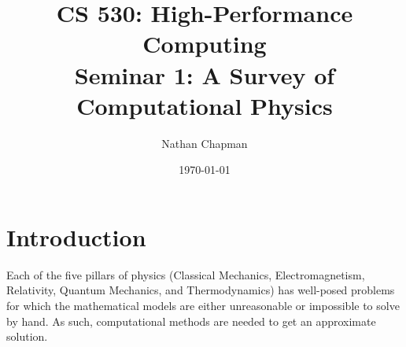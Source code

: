 \documentclass{report}
\title{CS 530: High-Performance Computing \\ Seminar 1: A Survey of Computational Physics}
\author{Nathan Chapman}
\affil{Department of Computer Science \\ Central Washington University}
\date{\today}
\begin{document}
\maketitle

\tableofcontents










\chapter{Introduction}

    Each of the five pillars of physics (Classical Mechanics, Electromagnetism, Relativity, Quantum Mechanics, and Thermodynamics) has well-posed problems for which the mathematical models are either unreasonable or impossible to solve by hand.  As such, computational methods are needed to get an approximate solution.  
    
\end{document}
